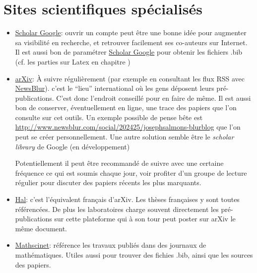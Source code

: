 \section{Sites scientifiques spécialisés}



\begin{itemize}
\item \href{http://scholar.google.com}{Scholar Google}:
ouvrir un compte peut être une bonne idée pour augmenter sa visibilité en recherche,
et retrouver facilement ses co-auteurs sur Internet.
Il est aussi bon de paramétrer \href{http://scholar.google.com}{Scholar Google} pour
obtenir les fichiers  .bib (cf. les parties sur Latex en chapitre )

\item \href{http://arxiv.org/}{arXiv}:
À suivre régulièrement (par exemple en consultant les flux RSS avec 
\href{https://www.newsblur.com/}{NewsBlur}). 
c'est le ``lieu'' international
où les gens déposent leurs pré-publications. C'est donc l'endroit conseillé pour en faire
de même. Il est aussi bon de conserver, éventuellement en ligne, une trace des papiers que
l'on consulte sur cet outils. Un exemple possible de pense bête est 
\href{http://www.newsblur.com/social/202425/josephsalmons-blurblog}
{http://www.newsblur.com/social/202425/josephsalmons-blurblog}
que l'on peut se créer personnellement. Une autre solution semble \^etre 
le \textit{scholar library} de Google
(en développement)


Potentiellement il peut être recommandé de suivre avec une certaine fréquence ce qui est soumis
chaque jour, voir profiter d'un groupe de lecture régulier pour discuter des papiers récents les plus
marquants.

\item \href{http://hal.archives-ouvertes.fr/}{Hal}: c'est l'équivalent français d'arXiv.
Les thèses françaises y sont toutes référencées. De plus les laboratoires charge souvent directement
les pré-publications sur cette plateforme qui \`a son tour peut poster sur arXiv le m\^eme document.


\item \href{http://www.ams.org/mathscinet/}{Mathscinet}: référence les travaux publiés dans
des journaux de mathématiques. Utiles aussi pour trouver des fichies .bib, ainsi que les sources
des papiers. 

\end{itemize}





